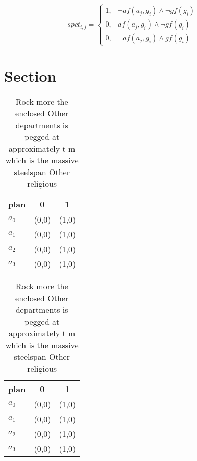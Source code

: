 \documentclass[a4paper]{article}
\begin{document}
\begin{equation}
spct_{i,j} =
\begin{cases}
1, & \text{$\neg af(a_j,g_i) \wedge \neg gf(g_i)$}\\
0, & \text{$af(a_j,g_i) \wedge \neg gf(g_i)$}\\
0, & \text{$\neg af(a_j,g_i) \wedge gf(g_i)$}
\end{cases}
\end{equation}

\section{Section}

\begin{table}
\begin{adjustbox}{width=0.7\columnwidth}
\begin{tabular}{|l|l|l|}
\hline
\textbf{plan} & \multicolumn{1}{c|}{\textbf{0}} & \multicolumn{1}{c|}{\textbf{1}} \\ \hline
\textbf{$a_0$}  & (0,0) & (1,0) \\ \hline
\textbf{$a_1$}  & (0,0) & (1,0) \\ \hline
\textbf{$a_2$}  & (0,0) & (1,0) \\ \hline
\textbf{$a_3$}  & (0,0) & (1,0) \\ \hline
\end{tabular}
\end{adjustbox}
\caption{Rock more the enclosed Other departments is pegged at approximately t m which is the massive steelspan Other religious 
}
\end{table}

\begin{table}
\begin{adjustbox}{width=0.7\columnwidth}
\begin{tabular}{|l|l|l|}
\hline
\textbf{plan} & \multicolumn{1}{c|}{\textbf{0}} & \multicolumn{1}{c|}{\textbf{1}} \\ \hline
\textbf{$a_0$}  & (0,0) & (1,0) \\ \hline
\textbf{$a_1$}  & (0,0) & (1,0) \\ \hline
\textbf{$a_2$}  & (0,0) & (1,0) \\ \hline
\textbf{$a_3$}  & (0,0) & (1,0) \\ \hline
\end{tabular}
\end{adjustbox}
\caption{Rock more the enclosed Other departments is pegged at approximately t m which is the massive steelspan Other religious 
}
\end{table}
\end{document}
